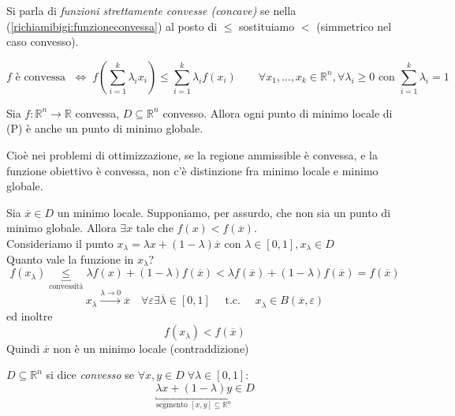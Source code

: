 Si parla di \emph{funzioni strettamente convesse (concave)} se 
nella (\ref{richiamibigi:funzioneconvessa}) al posto
 di $\leq$ sostituiamo $<$ (simmetrico nel caso convesso).

 \begin{observation}
  $$ f \text{ \`e convessa } \; \Longleftrightarrow \;
f\left(\displaystyle \sum_{i=1}^{k} \lambda_i x_i \right) \leq 
\displaystyle \sum_{i=1}^{k} \lambda_i f(x_i)
\qquad
\forall x_1, \ldots, x_k \in \mathbb{R}^{n}, \forall \lambda_i \geq 0
\text{ con }  \displaystyle \sum_{i=1}^{k} \lambda_i = 1
$$
 \end{observation}

\begin{theo}
 Sia $f: \mathbb{R}^n \rightarrow \mathbb{R}$ convessa,
 $D \subseteq \mathbb{R}^n$ convesso. Allora ogni punto di minimo
 locale di (P) \`e anche un punto di minimo globale.
\end{theo}

Cioè nei problemi di ottimizzazione, se la regione ammissible è convessa,
e la funzione obiettivo \`e convessa, non c'\`e distinzione fra minimo locale e 
minimo globale.
\begin{thproof}

 Sia $\overline{x} \in D$ un minimo locale. Supponiamo, per assurdo,
che non sia un punto di minimo globale. Allora $\exists x$ tale 
che $f(x) < f(\overline{x})$. \\
Consideriamo il punto $x_{\lambda} = \lambda x + (1-\lambda)\overline{x}$
con $\lambda \in [0,1],  x_{\lambda} \in D$\\
Quanto vale la funzione in $x_{\lambda}$?
 $$f(x_{\lambda}) \underbracket{\leq}_{\text{convessit\`a}}  \lambda f(x) +
 (1-\lambda)f(\overline{x}) < \lambda f(\overline{x})
 + (1-\lambda) f(\overline{x})
 = f(\overline{x})$$
 $$ x_{\lambda} \xrightarrow{\lambda \rightarrow 0} \overline{x} \quad
  \forall \varepsilon  \exists  \overline{\lambda} \in [0,1] \quad 
 \text{ t.c. }  \quad x_{\overline{\lambda}} \in  B(\overline{x}, \varepsilon)$$
ed inoltre
$$ f(x_{\overline{\lambda}}) < f(\overline{x})$$
Quindi $\overline{x}$ non \`e un minimo locale (contraddizione)
\end{thproof}

\begin{defn}
 $D \subseteq \mathbb{R}^{n}$ si dice \emph{convesso} se 
$\forall x,y \in D \; \forall \lambda \in [0,1]$:
$$ \underbracket{\lambda x + (1-\lambda)y}_{\text{segmento }  [x,y] \subseteq \mathbb{R}^{n}}\in D $$
\end{defn}


